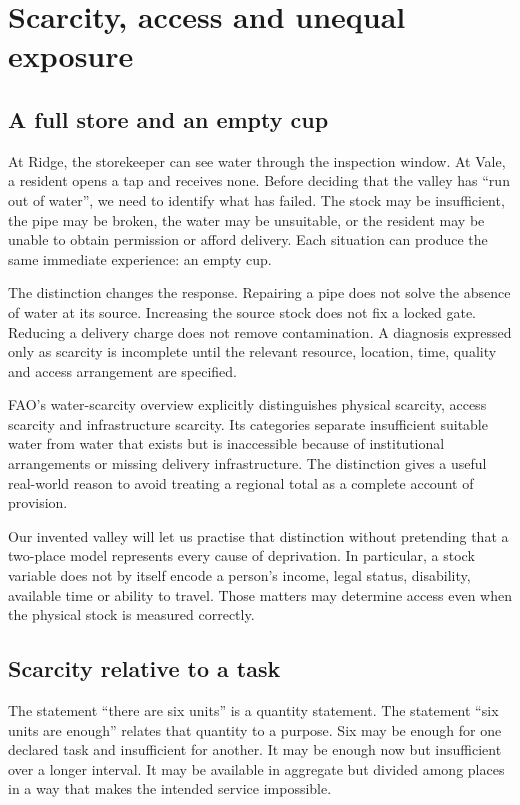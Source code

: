 \chapter{Scarcity, access and unequal exposure}\label{ch:scarcity}

\section{A full store and an empty cup}
At Ridge, the storekeeper can see water through the inspection window. At Vale, a resident opens a tap and receives none. Before deciding that the valley has ``run out of water'', we need to identify what has failed. The stock may be insufficient, the pipe may be broken, the water may be unsuitable, or the resident may be unable to obtain permission or afford delivery. Each situation can produce the same immediate experience: an empty cup.

The distinction changes the response. Repairing a pipe does not solve the absence of water at its source. Increasing the source stock does not fix a locked gate. Reducing a delivery charge does not remove contamination. A diagnosis expressed only as scarcity is incomplete until the relevant resource, location, time, quality and access arrangement are specified.

FAO's water-scarcity overview explicitly distinguishes physical scarcity, access scarcity and infrastructure scarcity. Its categories separate insufficient suitable water from water that exists but is inaccessible because of institutional arrangements or missing delivery infrastructure. The distinction gives a useful real-world reason to avoid treating a regional total as a complete account of provision.\cite{intro-water}

Our invented valley will let us practise that distinction without pretending that a two-place model represents every cause of deprivation. In particular, a stock variable does not by itself encode a person's income, legal status, disability, available time or ability to travel. Those matters may determine access even when the physical stock is measured correctly.

\section{Scarcity relative to a task}
The statement ``there are six units'' is a quantity statement. The statement ``six units are enough'' relates that quantity to a purpose. Six may be enough for one declared task and insufficient for another. It may be enough now but insufficient over a longer interval. It may be available in aggregate but divided among places in a way that makes the intended service impossible.

